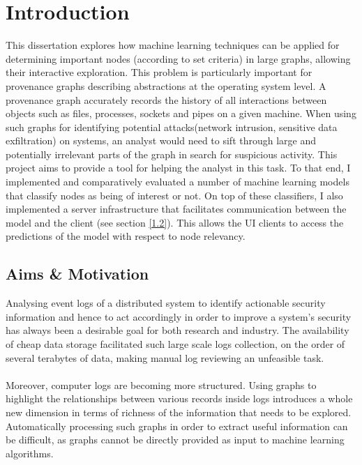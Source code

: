 
	
	\chapter{Introduction}
	
	This dissertation explores how machine learning techniques can be applied for determining important nodes (according to set criteria) in large graphs, allowing their interactive exploration. This problem is particularly important for provenance graphs describing abstractions at the operating system level. A provenance graph accurately records the history of all interactions between objects such as files, processes, sockets and pipes on a given machine. When using such graphs for identifying potential attacks(network intrusion, sensitive data exfiltration) on systems, an analyst would need to sift through large and potentially irrelevant parts of the graph in search for suspicious activity. This project aims to provide a tool for helping the analyst in this task. To that end, I implemented and comparatively evaluated a number of machine learning models that classify nodes as being of interest or not. On top of these classifiers, I also implemented a server infrastructure that facilitates communication between the model and the client (see section \ref{1.2}). This allows the UI clients to access the predictions of the model with respect to node relevancy. 
	
	\section{Aims \& Motivation}  \label{1.1}
	Analysing event logs of a distributed system to identify actionable security information and hence to act accordingly in order to improve a system's security has always been a desirable goal for both research and industry. The availability of cheap data storage facilitated such large scale logs collection, on the order of several terabytes of data, making manual log reviewing an unfeasible task. 
	\\ \\
	Moreover, computer logs are becoming more structured. Using graphs to highlight the relationships between various records inside logs introduces a whole new dimension in terms of richness of the information that needs to be explored. Automatically processing such graphs in order to extract useful information can be difficult, as graphs cannot be directly provided as input to machine learning algorithms.
	
